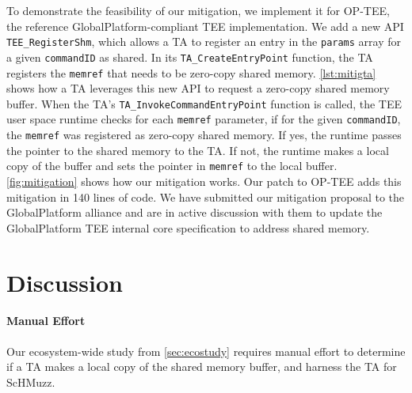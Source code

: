 \documentclass[conference]{IEEEtran}
\newcommand{\sysname}{ScHMuzz\xspace}
\newcommand{\optee}{OP-TEE\xspace}
\begin{document}
To demonstrate the feasibility of our mitigation, we implement it for \optee, the 
reference GlobalPlatform-compliant TEE implementation. We add a new API \texttt{TEE\_RegisterShm}, 
which allows a TA to register an entry in the \texttt{params} array for a given 
\texttt{commandID} as shared. In its \texttt{TA\_CreateEntryPoint} function, the 
TA registers the \texttt{memref} that needs to be zero-copy shared memory. 
\autoref{lst:mitigta} shows how a TA leverages this new API to request a
zero-copy shared memory buffer. When the TA's \texttt{TA\_InvokeCommandEntryPoint} function is called, the TEE user 
space runtime checks for each \texttt{memref} parameter, if for the given 
\texttt{commandID}, the \texttt{memref} was registered as zero-copy shared memory. 
If yes, the runtime passes the pointer to the shared memory to the TA. 
If not, the runtime makes a local copy of the 
buffer and sets the pointer in \texttt{memref} to the local buffer.
\autoref{fig:mitigation} shows how our mitigation works.
Our patch to \optee adds this mitigation in 140 lines 
of code.
We have submitted our mitigation proposal to the GlobalPlatform alliance and are 
in active discussion with them to update the GlobalPlatform TEE internal core 
specification to address shared memory.

\begin{listing}[h]
    
    \label{lst:mitigta}
\end{listing}

\section{Discussion}\label{sec:discussion}

\paragraph{Manual Effort}
Our ecosystem-wide study from \autoref{sec:ecostudy} requires manual effort to 
determine if a TA makes a local copy of the shared memory buffer, and harness the 
TA for \sysname.
\end{document}
